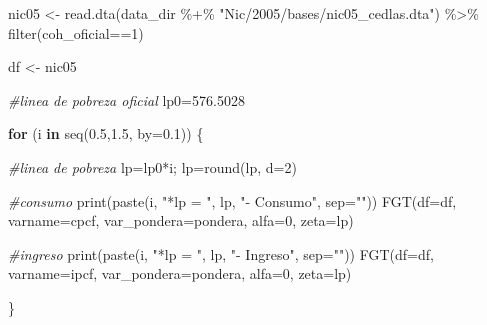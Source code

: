 \documentclass[
]{book}
\newenvironment{Shaded}{\begin{snugshade}}{\end{snugshade}}
\newcommand{\AttributeTok}[1]{\textcolor[rgb]{0.77,0.63,0.00}{#1}}
\newcommand{\CommentTok}[1]{\textcolor[rgb]{0.56,0.35,0.01}{\textit{#1}}}
\newcommand{\ControlFlowTok}[1]{\textcolor[rgb]{0.13,0.29,0.53}{\textbf{#1}}}
\newcommand{\DecValTok}[1]{\textcolor[rgb]{0.00,0.00,0.81}{#1}}
\newcommand{\FloatTok}[1]{\textcolor[rgb]{0.00,0.00,0.81}{#1}}
\newcommand{\FunctionTok}[1]{\textcolor[rgb]{0.00,0.00,0.00}{#1}}
\newcommand{\NormalTok}[1]{#1}
\newcommand{\OtherTok}[1]{\textcolor[rgb]{0.56,0.35,0.01}{#1}}
\newcommand{\SpecialCharTok}[1]{\textcolor[rgb]{0.00,0.00,0.00}{#1}}
\newcommand{\StringTok}[1]{\textcolor[rgb]{0.31,0.60,0.02}{#1}}
\begin{document}
\begin{Shaded}
\begin{Highlighting}[]
\NormalTok{nic05 }\OtherTok{\textless{}{-}} \FunctionTok{read.dta}\NormalTok{(data\_dir }\SpecialCharTok{\%+\%} \StringTok{"Nic/2005/bases/nic05\_cedlas.dta"}\NormalTok{) }\SpecialCharTok{\%\textgreater{}\%} 
         \FunctionTok{filter}\NormalTok{(coh\_oficial}\SpecialCharTok{==}\DecValTok{1}\NormalTok{)}

\NormalTok{df }\OtherTok{\textless{}{-}}\NormalTok{ nic05 }

\CommentTok{\#linea de pobreza oficial}
\NormalTok{lp0}\OtherTok{=}\FloatTok{576.5028}


\ControlFlowTok{for}\NormalTok{ (i }\ControlFlowTok{in} \FunctionTok{seq}\NormalTok{(}\FloatTok{0.5}\NormalTok{,}\FloatTok{1.5}\NormalTok{, }\AttributeTok{by=}\FloatTok{0.1}\NormalTok{)) \{}
  
  \CommentTok{\#linea de pobreza}
\NormalTok{  lp}\OtherTok{=}\NormalTok{lp0}\SpecialCharTok{*}\NormalTok{i; lp}\OtherTok{=}\FunctionTok{round}\NormalTok{(lp, }\AttributeTok{d=}\DecValTok{2}\NormalTok{)}
  
  \CommentTok{\#consumo}
  \FunctionTok{print}\NormalTok{(}\FunctionTok{paste}\NormalTok{(i, }\StringTok{"*lp = "}\NormalTok{, lp, }\StringTok{"{-} Consumo"}\NormalTok{, }\AttributeTok{sep=}\StringTok{""}\NormalTok{))}
  \FunctionTok{FGT}\NormalTok{(}\AttributeTok{df=}\NormalTok{df, }\AttributeTok{varname=}\NormalTok{cpcf, }\AttributeTok{var\_pondera=}\NormalTok{pondera, }\AttributeTok{alfa=}\DecValTok{0}\NormalTok{, }\AttributeTok{zeta=}\NormalTok{lp)}
  
  \CommentTok{\#ingreso}
  \FunctionTok{print}\NormalTok{(}\FunctionTok{paste}\NormalTok{(i, }\StringTok{"*lp = "}\NormalTok{, lp, }\StringTok{"{-} Ingreso"}\NormalTok{, }\AttributeTok{sep=}\StringTok{""}\NormalTok{))}
  \FunctionTok{FGT}\NormalTok{(}\AttributeTok{df=}\NormalTok{df, }\AttributeTok{varname=}\NormalTok{ipcf, }\AttributeTok{var\_pondera=}\NormalTok{pondera, }\AttributeTok{alfa=}\DecValTok{0}\NormalTok{, }\AttributeTok{zeta=}\NormalTok{lp)  }
  
\NormalTok{\}}
\end{Highlighting}
\end{Shaded}
\end{document}
